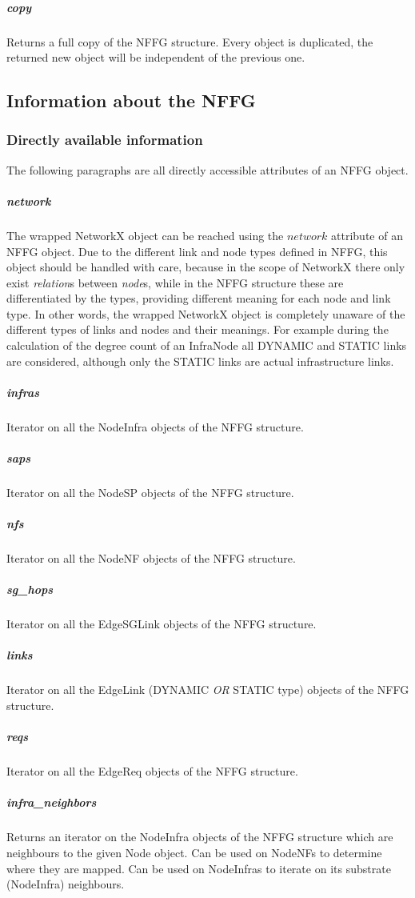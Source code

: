 \documentclass[a4paper,10pt]{scrartcl}
\begin{document}
\subparagraph{copy}
Returns a full copy of the NFFG structure. Every object is duplicated, 
the returned new object will be independent of the previous one.

\subsection{Information about the NFFG}

\subsubsection{Directly available information}

The following paragraphs are all directly accessible attributes of an NFFG object.

\subparagraph{network}
The wrapped NetworkX object can be reached using the $network$ attribute of an NFFG object. 
Due to the different link and node types defined in NFFG, this object should be handled with care, 
because in the scope of NetworkX there only exist \emph{relation}s between \emph{node}s,
while in the NFFG structure these are differentiated by the types, 
providing different meaning for each node and link type. In other words, the wrapped NetworkX 
object is completely unaware of the different types of links and nodes and their meanings.
For example during the calculation of the degree count of an InfraNode all DYNAMIC and STATIC links
are considered, although only the STATIC links are actual infrastructure links.

\subparagraph{infras}
Iterator on all the NodeInfra objects of the NFFG structure. 

\subparagraph{saps}
Iterator on all the NodeSP objects of the NFFG structure. 

\subparagraph{nfs}
Iterator on all the NodeNF objects of the NFFG structure. 

\subparagraph{sg\_hops}
Iterator on all the EdgeSGLink objects of the NFFG structure. 

\subparagraph{links}
Iterator on all the EdgeLink (DYNAMIC \emph{OR} STATIC type) objects of the NFFG structure. 

\subparagraph{reqs}
Iterator on all the EdgeReq objects of the NFFG structure. 

\subparagraph{infra\_neighbors}
Returns an iterator on the NodeInfra objects of the NFFG structure which are neighbours to the given Node object.
Can be used on NodeNFs to determine where they are mapped. 
Can be used on NodeInfras to iterate on its substrate (NodeInfra) neighbours.
\end{document}
